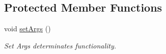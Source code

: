 \subsection*{Protected Member Functions}
\begin{DoxyCompactItemize}
\item 
\hypertarget{classstats__keeper_af5b6f86db5cbfae21c4055aa498ee426}{
void \hyperlink{classstats__keeper_af5b6f86db5cbfae21c4055aa498ee426}{setArgs} ()}
\label{classstats__keeper_af5b6f86db5cbfae21c4055aa498ee426}

\begin{DoxyCompactList}\small\item\em Set Args determinates functionality. \item\end{DoxyCompactList}\end{DoxyCompactItemize}
